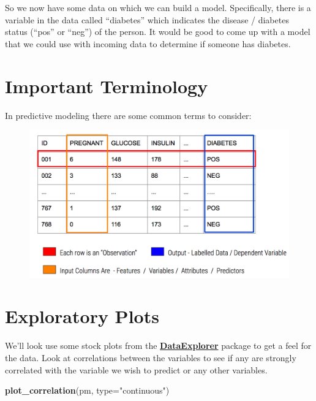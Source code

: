 \documentclass[]{book}
\newenvironment{Shaded}{\begin{snugshade}}{\end{snugshade}}
\newcommand{\KeywordTok}[1]{\textcolor[rgb]{0.13,0.29,0.53}{\textbf{#1}}}
\newcommand{\DataTypeTok}[1]{\textcolor[rgb]{0.13,0.29,0.53}{#1}}
\newcommand{\StringTok}[1]{\textcolor[rgb]{0.31,0.60,0.02}{#1}}
\newcommand{\NormalTok}[1]{#1}
\begin{document}
So we now have some data on which we can build a model. Specifically,
there is a variable in the data called ``diabetes'' which indicates the
disease / diabetes status (``pos'' or ``neg'') of the person. It would
be good to come up with a model that we could use with incoming data to
determine if someone has diabetes.

\section{Important Terminology}\label{important-terminology}

In predictive modeling there are some common terms to consider:

\begin{figure}
\centering
\includegraphics[width=4.94792in]{./PICS/features2.png}
\caption{}
\end{figure}

\section{Exploratory Plots}\label{exploratory-plots}

We'll look use some stock plots from the
\href{https://github.com/elastacloud/automatic-data-explorer}{\textbf{DataExplorer}}
package to get a feel for the data. Look at correlations between the
variables to see if any are strongly correlated with the variable we
wish to predict or any other variables.

\begin{Shaded}
\begin{Highlighting}[]
\KeywordTok{plot_correlation}\NormalTok{(pm, }\DataTypeTok{type=}\StringTok{"continuous"}\NormalTok{)}
\end{Highlighting}
\end{Shaded}
\end{document}
